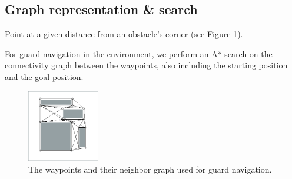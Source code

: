 \subsection{Graph representation \& search}
\begin{definition}[Waypoint]
Point at a given distance from an obstacle's corner (see Figure \ref{waypointNavigation}).
\end{definition}
For guard navigation in the environment, we perform an A*-search on the connectivity graph between the waypoints, also including the starting position and the goal position.

\begin{figure}[h!t]
	\begin{center}
	\includegraphics[width=119px]{fig/waypointnavigation.png}
	\end{center}
	\caption{The waypoints and their neighbor graph used for guard navigation.}
	\label{waypointNavigation}
\end{figure}
